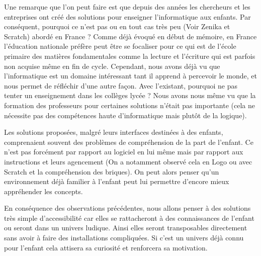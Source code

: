 Une remarque que l'on peut faire est que depuis des années les chercheurs et les entreprises ont créé des solutions pour enseigner l'informatique aux enfants. Par conséquent, pourquoi ce n'est pas ou en tout cas très peu (Voir Zenika et Scratch) abordé en France ? Comme déjà évoqué en début de mémoire, en France l'éducation nationale préfère peut être se focaliser pour ce qui est de l'école primaire des matières fondamentales comme la lecture et l'écriture qui est parfois non acquise même en fin de cycle. Cependant, nous avons déjà vu que l'informatique est un domaine intéressant tant il apprend à percevoir le monde, et nous permet de réfléchir d'une autre façon. \cite{53} Avec l'existant, pourquoi ne pas tenter un enseignement dans les collèges lycée ? Nous avons nous même vu que la formation des professeurs pour certaines solutions n'était pas importante (cela ne nécessite pas des compétences haute d'informatique mais plutôt de la logique).

Les solutions proposées, malgré leurs interfaces destinées à des enfants, comprenaient souvent des problèmes de compréhension de la part de l'enfant. Ce n'est pas forcément par rapport au logiciel en lui même mais par rapport aux instructions et leurs agencement (On a notamment observé cela en Logo ou avec Scratch et la compréhension des briques). On peut alors penser qu'un environnement déjà familier à l'enfant peut lui permettre d'encore mieux appréhender les concepts.

En conséquence des observations précédentes, nous allons penser à des solutions très simple d'accessibilité car elles se rattacheront à des connaissances de l'enfant ou seront dans un univers ludique. Ainsi elles seront transposables directement sans avoir à faire des installations compliquées. Si c'est un univers déjà connu pour l'enfant cela attisera sa curiosité et renforcera sa motivation. 

\newpage

